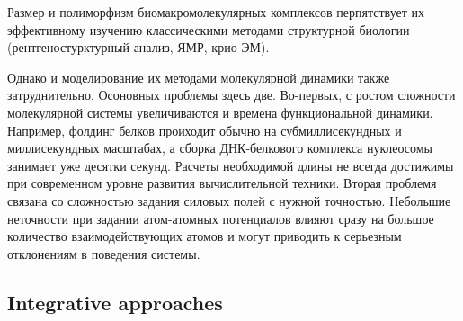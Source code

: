 \begin{frame}
{{Размер и полиморфизм биомакромолекулярных комплексов перпятствует их эффективному изучению классическими методами структурной биологии (рентгеностурктурный анализ, ЯМР, крио-ЭМ).

Однако и моделирование их методами молекулярной динамики также затруднительно.
Осоновных проблемы здесь две. Во-первых, с ростом сложности молекулярной системы увеличиваются и времена функциональной динамики. Например, фолдинг белков проиходит обычно на субмиллисекундных и миллисекундных масштабах, а сборка ДНК-белкового комплекса нуклеосомы занимает уже десятки секунд. Расчеты необходимой длины не всегда достижимы при современном уровне развития вычислительной техники.
Вторая проблемя связана со сложностью задания силовых полей с нужной точностью. Небольшие неточности при задании атом-атомных потенциалов влияют сразу на большое количество взаимодействующих атомов и могут приводить к серьезным отклонениям в поведения системы.

}}
\end{frame}



\subsection{Integrative approaches}

